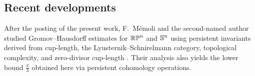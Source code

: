 \subsection*{Recent developments}

After the posting of the present work, F.~M\'emoli and the second-named author studied Gromov--Hausdorff estimates for \(\mathbb{RP}^n\) and \(\mathbb{S}^n\) using persistent invariants derived from cup-length, the Lyusternik--Schnirelmann category, topological complexity, and zero-divisor cup-length \cite{memoli2025persistence}.
Their analysis also yields the lower bound \(\frac{\pi}{3}\) obtained here via persistent cohomology operations.

